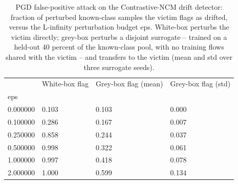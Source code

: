 \begin{table}
\caption{PGD false-positive attack on the Contrastive-NCM drift detector: fraction of perturbed known-class samples the victim flags as drifted, versus the L-infinity perturbation budget eps. White-box perturbs the victim directly; grey-box perturbs a disjoint surrogate -- trained on a held-out 40 percent of the known-class pool, with no training flows shared with the victim -- and transfers to the victim (mean and std over three surrogate seeds).}
\label{tab:rq3-pgd-false-positive}
\begin{tabular}{llll}
\toprule
 & White-box flag & Grey-box flag (mean) & Grey-box flag (std) \\
eps &  &  &  \\
\midrule
0.000000 & 0.103 & 0.103 & 0.000 \\
0.100000 & 0.286 & 0.167 & 0.007 \\
0.250000 & 0.858 & 0.244 & 0.037 \\
0.500000 & 0.998 & 0.322 & 0.061 \\
1.000000 & 0.997 & 0.418 & 0.078 \\
2.000000 & 1.000 & 0.599 & 0.134 \\
\bottomrule
\end{tabular}
\end{table}
